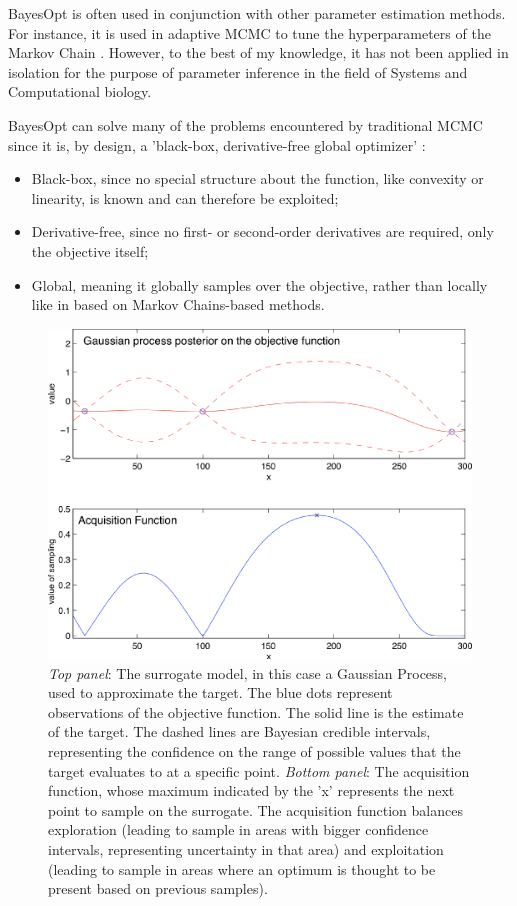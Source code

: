 \documentclass[bsc,frontabs,singlespacing,parskip,deptreport]{infthesis}
\begin{document}
BayesOpt is often used in conjunction with other parameter estimation methods. For instance, it is used in adaptive MCMC to tune the hyperparameters of the Markov Chain \cite{mahendran2012adaptive}. However, to the best of my knowledge, it has not been applied in isolation for the purpose of parameter inference in the field of Systems and Computational biology.

BayesOpt can solve many of the problems encountered by traditional MCMC since it is, by design, a 'black-box, derivative-free global optimizer' \cite{Jones1998EfficientGO}:

\begin{itemize}
    \item Black-box, since no special structure about the function, like convexity or linearity, is known and can therefore be exploited;
    
    \item Derivative-free, since no first- or second-order derivatives are required, only the objective itself;
    
    \item Global, meaning it globally samples over the objective, rather than locally like in based on Markov Chains-based methods.
\end{itemize}

\begin{figure}[ht]
    \centering
    \includegraphics[width=.6\linewidth]{Images/Other/bayesOpt.png}
    \caption{\textit{Top panel}: The surrogate model, in this case a Gaussian Process, used to approximate the target. The blue dots represent observations of the objective function. The solid line is the estimate of the target. The dashed lines are Bayesian credible intervals, representing the confidence on the range of possible values that the target evaluates to at a specific point.
    \textit{Bottom panel}: The acquisition function, whose maximum indicated by the 'x' represents the next point to sample on the surrogate. The acquisition function balances exploration (leading to sample in areas with bigger confidence intervals, representing uncertainty in that area) and exploitation (leading to sample in areas where an optimum is thought to be present based on previous samples).}
    \label{fig:GP}
\end{figure}
\end{document}
